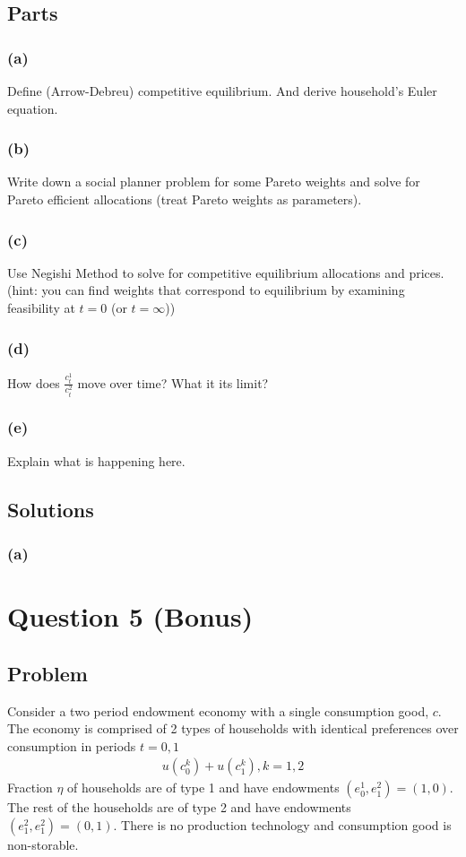 \documentclass[10pt, a4paper]{article}
\begin{document}
  \subsection*{Parts}
    \subsubsection*{(a)}
      Define (Arrow-Debreu) competitive equilibrium. And derive household's Euler equation.
    \subsubsection*{(b)}
      Write down a social planner problem for some Pareto weights and solve for Pareto efficient allocations (treat Pareto weights as parameters).
    \subsubsection*{(c)}
      Use Negishi Method to solve for competitive equilibrium allocations and prices. (hint: you can find weights that correspond to equilibrium by examining feasibility at $t = 0$ (or $t = \infty$))
    \subsubsection*{(d)}
      How does $\frac{c^1_t}{c^2_t}$ move over time? What it its limit?
    \subsubsection*{(e)}
      Explain what is happening here.
  \subsection*{Solutions}
    \subsubsection*{(a)}
      
\section*{Question 5 (Bonus)}
  \subsection*{Problem}
    Consider a two period endowment economy with a single consumption good, $c$. The economy is comprised of 2 types of households with identical preferences over consumption in periods $t = 0,1$
    \begin{gather*}
      u(c^k_0) + u(c^k_1), k = 1,2
    \end{gather*}
    Fraction $\eta$ of households are of type 1 and have endowments $(e^1_0, e^2_1) = (1,0)$. The rest of the households are of type 2 and have endowments $(e^2_1, e^2_1) = (0,1)$. There is no production technology and consumption good is non-storable.
\end{document}
